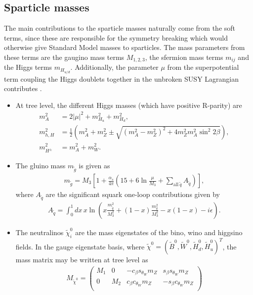 \documentclass[twoside,english]{uiofysmaster}
\begin{document}
 \subsection{Sparticle masses}
 The main contributions to the sparticle masses naturally come from the soft terms, since these are responsible for the symmetry breaking which would otherwise give Standard Model masses to sparticles. The mass parameters from these terms are the gaugino mass terms $M_{1,2,3}$, the sfermion mass terms $m_{ij}$ and the Higgs terms $m_{H_{u/d}}$. Additionally, the parameter $\mu$ from the superpotential term coupling the Higgs doublets together in the unbroken SUSY Lagrangian contributes \cite{Martin:1997ns}.
 \begin{itemize}
 	\item At tree level, the different Higgs masses (which have positive R-parity) are
 	\begin{align}
 		m_A^2 &= 2|\mu|^2 + m^2_{H_u} + m^2_{H_d},\label{eq:mssm_higgs_masses1}\\
 		m^2_{h,H} &= \frac{1}{2} \left( m_A^2 + m_Z^2 \pm \sqrt{(m_A^2 - m_Z^2)^2 + 4m_Z^2m_A^2\sin^2 2\beta} \right),\label{eq:mssm_higgs_masses2}\\
 		m^2_{H^\pm} &= m_A^2 + m_W^2.
 	\end{align}
 	\item The gluino mass $m_{\tilde g}$ is given as
 	\begin{align}
 		m_{\tilde g} = M_3 \left[ 1 + \frac{\alpha_s}{4\pi}\left( 15 + 6\ln\frac{\mu}{M_3} + \sum_{\mathrm{all} ~\tilde q} A_{\tilde q} \right)\right],
 	\end{align}
 	where $A_{\tilde q}$ are the significant squark one-loop contributions given by
 	\begin{align}
 		A_{\tilde q} = \int_0^1 dx \, x \ln\left( x \frac{m^2_{\tilde q}}{M_3^2} + (1-x)\frac{m_q^2}{M_3^2} - x(1-x) - i\epsilon \right).
 	\end{align}
 	\item The neutralinos $\tilde\chi_i^0$ are the mass eigenstates of the bino, wino and higgsino fields. In the gauge eigenstate basis, where $\tilde\chi^{0} = (\tilde B^0, \tilde W^0, \tilde H_d^0, \tilde H_u^0)^T$, the mass matrix may be written at tree level as
 	\begin{align}
 		M_{\tilde \chi^0} = \begin{pmatrix}
 			M_1 & 0 & - c_\beta s_{\theta_W} m_Z &  s_\beta s_{\theta_W} m_Z \\
 			0 & M_2 &  c_\beta c_{\theta_W} m_Z & - s_\beta c_{\theta_W} m_Z\\

\end{pmatrix}
\end{align}
\end{itemize}
\end{document}
